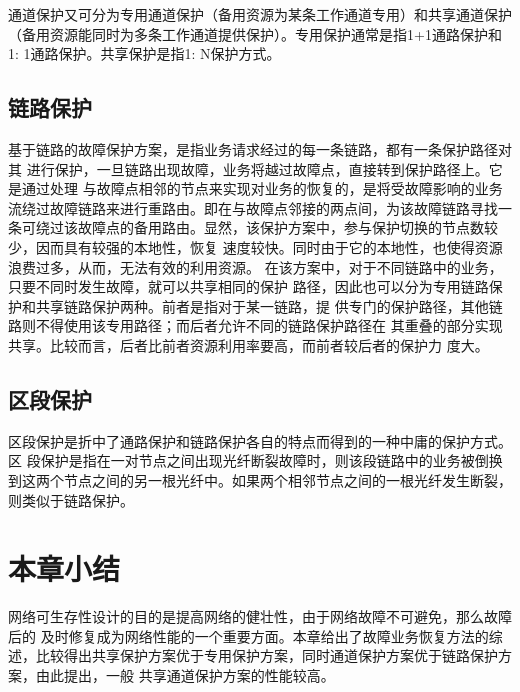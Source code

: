 通道保护又可分为专用通道保护（备用资源为某条工作通道专用）和共享通道保护（备用资源能同时为多条工作通道提供保护）。专用保护通常是指1+1通路保护和1: 1通路保护。共享保护是指1: N保护方式。
\subsection{链路保护}
基于链路的故障保护方案，是指业务请求经过的每一条链路，都有一条保护路径对其 进行保护，一旦链路出现故障，业务将越过故障点，直接转到保护路径上。它是通过处理 与故障点相邻的节点来实现对业务的恢复的，是将受故障影响的业务流绕过故障链路来进行重路由。即在与故障点邻接的两点间，为该故障链路寻找一条可绕过该故障点的备用路由。显然，该保护方案中，参与保护切换的节点数较少，因而具有较强的本地性，恢复 速度较快。同时由于它的本地性，也使得资源浪费过多，从而，无法有效的利用资源。
在该方案中，对于不同链路中的业务，只要不同时发生故障，就可以共享相同的保护 路径，因此也可以分为专用链路保护和共享链路保护两种。前者是指对于某一链路，提 供专门的保护路径，其他链路则不得使用该专用路径；而后者允许不同的链路保护路径在 其重叠的部分实现共享。比较而言，后者比前者资源利用率要高，而前者较后者的保护力 度大。
\subsection{区段保护}
区段保护是折中了通路保护和链路保护各自的特点而得到的一种中庸的保护方式。区 段保护是指在一对节点之间出现光纤断裂故障时，则该段链路中的业务被倒换到这两个节点之间的另一根光纤中。如果两个相邻节点之间的一根光纤发生断裂，则类似于链路保护。
\section{本章小结}
网络可生存性设计的目的是提高网络的健壮性，由于网络故障不可避免，那么故障后的 及时修复成为网络性能的一个重要方面。本章给出了故障业务恢复方法的综述，比较得出共享保护方案优于专用保护方案，同时通道保护方案优于链路保护方案，由此提出，一般 共享通道保护方案的性能较高。



